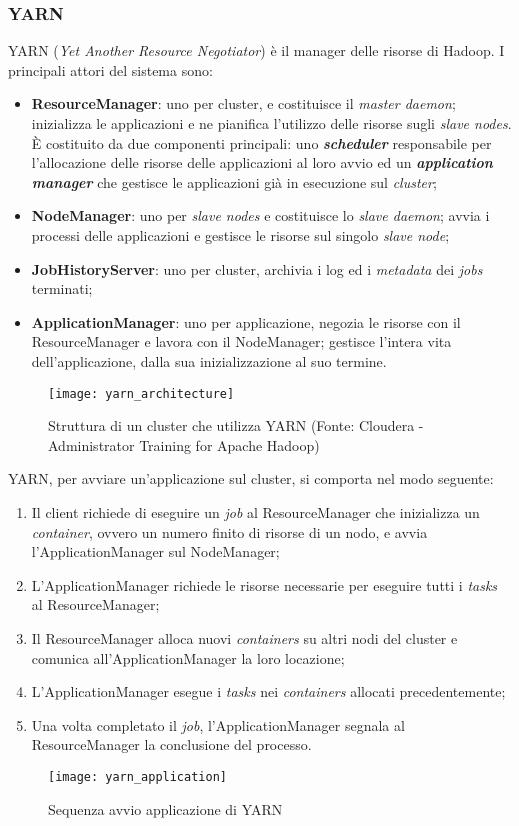 \subsubsection{YARN}
YARN (\textit{Yet Another Resource Negotiator}) è il manager delle risorse di Hadoop. I principali attori del sistema sono:
\begin{itemize}
	\item \textbf{ResourceManager}: uno per \gls{cluster}, e costituisce il \textit{master \gls{daemon}}; inizializza le applicazioni e ne pianifica l'utilizzo delle risorse sugli \textit{slave nodes}. È costituito da due componenti principali: uno \textbf{\textit{scheduler}} responsabile per l'allocazione delle risorse delle applicazioni al loro avvio ed un \textbf{\textit{application manager}} che gestisce le applicazioni già in esecuzione sul \textit{cluster};
	\item \textbf{NodeManager}: uno per \textit{slave nodes} e costituisce lo \textit{slave \gls{daemon}}; avvia i processi delle applicazioni e gestisce le risorse sul singolo \textit{slave node};
	\item \textbf{JobHistoryServer}: uno per \gls{cluster}, archivia i log ed i \textit{metadata} dei \textit{jobs} terminati;
	\item \textbf{ApplicationManager}: uno per applicazione, negozia le risorse con il ResourceManager e lavora con il NodeManager; gestisce l'intera vita dell'applicazione, dalla sua inizializzazione al suo termine. 
\end{itemize}
\begin{figure}[!h]
	\centering
	\texttt{[image: yarn\_architecture]}
	\caption{Struttura di un cluster che utilizza YARN (Fonte: Cloudera - Administrator Training for Apache Hadoop)}
\end{figure}
YARN, per avviare un'applicazione sul \gls{cluster}, si comporta nel modo seguente:
\begin{enumerate}
	\item Il client richiede di eseguire un \textit{job} al ResourceManager che inizializza un \textit{container}, ovvero un numero finito di risorse di un nodo, e avvia l'ApplicationManager sul NodeManager;
	\item L'ApplicationManager richiede le risorse necessarie per eseguire tutti i \textit{tasks} al ResourceManager;
	\item Il ResourceManager alloca nuovi \textit{containers} su altri nodi del \gls{cluster} e comunica all'ApplicationManager la loro locazione;
	\item L'ApplicationManager esegue i \textit{tasks} nei \textit{containers} allocati precedentemente;
	\item Una volta completato il \textit{job}, l'ApplicationManager segnala al ResourceManager la conclusione del processo.
\end{enumerate} 
\begin{figure}[!h]
	\centering
	\texttt{[image: yarn\_application]}
	\caption{Sequenza avvio applicazione di YARN}
\end{figure}
\clearpage
